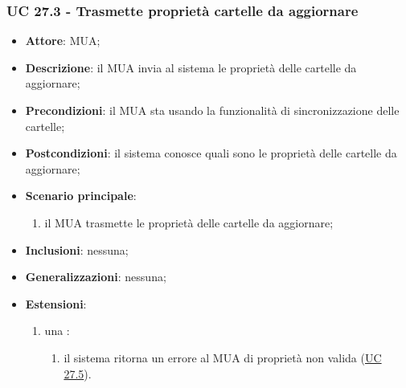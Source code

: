     \subsubsection{UC 27.3 - Trasmette proprietà cartelle da aggiornare} \label{sec:UC27.3}
    \begin{itemize}
        \item \textbf{Attore}: MUA;
        \item \textbf{Descrizione}: il MUA invia al sistema le proprietà delle cartelle da aggiornare;
        \item \textbf{Precondizioni}: il MUA sta usando la funzionalità di sincronizzazione delle cartelle;
        \item \textbf{Postcondizioni}: il sistema conosce quali sono le proprietà delle cartelle da aggiornare;
        \item \textbf{Scenario principale}:
            \begin{enumerate}
                \item il MUA trasmette le proprietà delle cartelle da aggiornare;
            \end{enumerate}
        \item \textbf{Inclusioni}: nessuna;
        \item \textbf{Generalizzazioni}: nessuna;
        \item \textbf{Estensioni}:
            \begin{enumerate}[label=\alph*.]
                \item una :
                \begin{enumerate}[label=\arabic*.]
                    \item il sistema ritorna un errore al MUA di proprietà non valida (\hyperref[sec:UC27.5]{UC 27.5}).
                \end{enumerate}
            \end{enumerate}
    \end{itemize}



